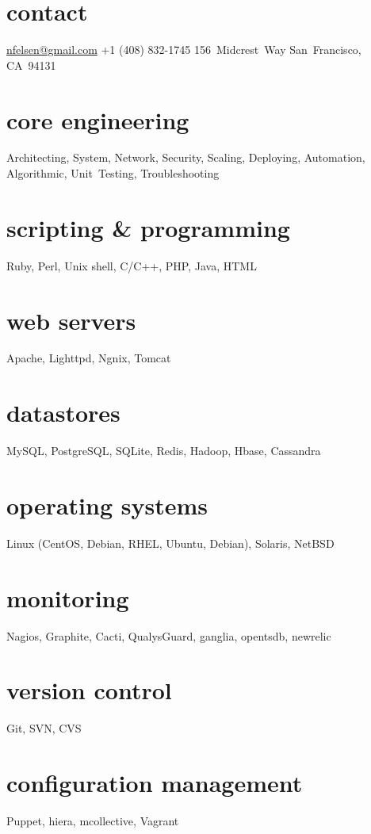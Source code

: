 \documentclass[]{friggeri-cv} %
\begin{document}


\begin{aside} %
\section{contact}
\href{mailto:nfelsen@gmail.com}{nfelsen@gmail.com}
+1 (408) 832-1745
156~Midcrest~Way
San~Francisco, CA~94131
\section{core engineering}
Architecting, System, Network, Security, Scaling, Deploying, Automation, Algorithmic, Unit~Testing, Troubleshooting
\section{scripting \& programming}
Ruby, Perl, Unix shell, C/C++, PHP, Java, HTML
\section{web servers}
Apache, Lighttpd, Ngnix, Tomcat
\section{datastores}
MySQL, PostgreSQL, SQLite, Redis, Hadoop, Hbase, Cassandra
\section{operating systems}
Linux (CentOS, Debian, RHEL, Ubuntu, Debian), Solaris, NetBSD
\section{monitoring}
Nagios, Graphite, Cacti, QualysGuard, ganglia, opentsdb, newrelic
\section{version control}
Git, SVN, CVS
\section{configuration management}
Puppet, hiera, mcollective, Vagrant
\end{aside}
\end{document}
